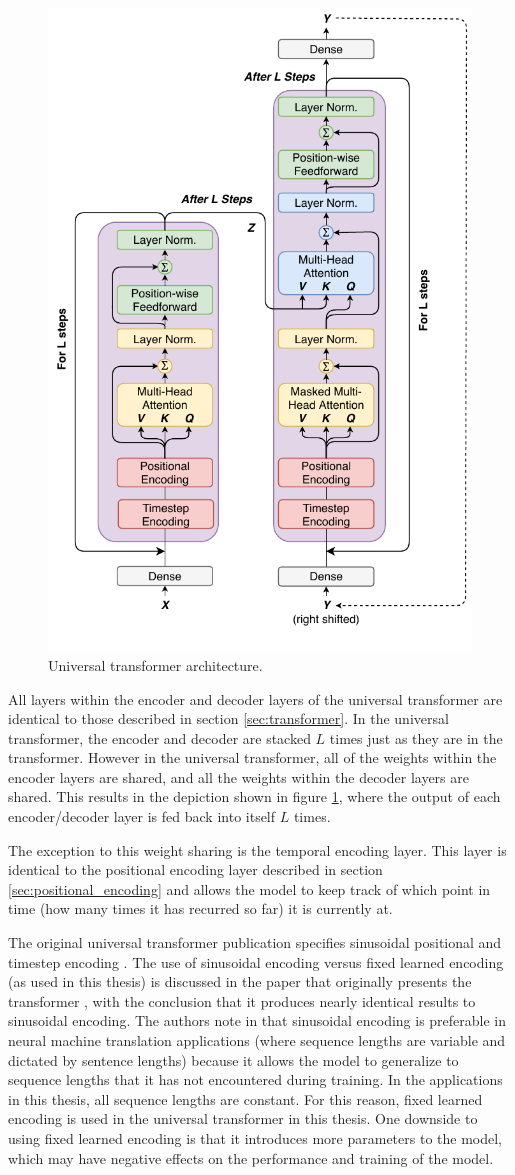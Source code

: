 \begin{figure}[htbp]
	\centerline{\includegraphics[width=.5\textwidth]{images/universal_transformer.pdf}}
	\caption{Universal transformer architecture.}
	\label{fig:universal_transformer}
\end{figure}

All layers within the encoder and decoder layers of the universal transformer are identical to those described in section \ref{sec:transformer}.
In the universal transformer, the encoder and decoder are stacked $L$ times just as they are in the transformer.
However in the universal transformer, all of the weights within the encoder layers are shared, and all the weights within the decoder layers are shared.
This results in the depiction shown in figure \ref{fig:universal_transformer}, where the output of each encoder/decoder layer is fed back into itself $L$ times.

The exception to this weight sharing is the temporal encoding layer.
This layer is identical to the positional encoding layer described in section \ref{sec:positional_encoding} and allows the model to keep track of which point in time (how many times it has recurred so far) it is currently at.

The original universal transformer publication specifies sinusoidal positional and timestep encoding \cite{Dehghani2018}.
The use of sinusoidal encoding versus fixed learned encoding (as used in this thesis) is discussed in the paper that originally presents the transformer \cite{Vaswani2017}, with the conclusion that it produces nearly identical results to sinusoidal encoding.
The authors note in \cite{Vaswani2017} that sinusoidal encoding is preferable in neural machine translation applications (where sequence lengths are variable and dictated by sentence lengths) because it allows the model to generalize to sequence lengths that it has not encountered during training.
In the applications in this thesis, all sequence lengths are constant.
For this reason, fixed learned encoding is used in the universal transformer in this thesis.
One downside to using fixed learned encoding is that it introduces more parameters to the model, which may have negative effects on the performance and training of the model.


